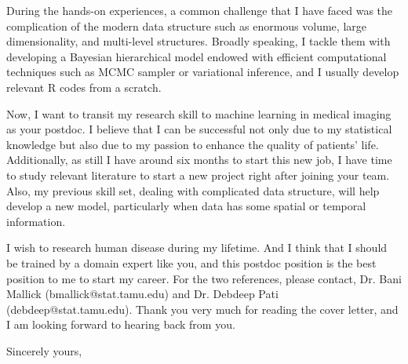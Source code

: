 \documentclass[9pt]{letter} %
\begin{document}
\begin{letter}{
}
During the hands-on experiences, a common challenge that I have faced was the complication of the modern data structure such as enormous volume, large dimensionality, and multi-level structures. Broadly speaking, I tackle them with developing a Bayesian hierarchical model endowed with efficient computational techniques such as MCMC sampler or variational inference, and I usually develop relevant R codes from a scratch.

Now, I want to transit my research skill to machine learning in medical imaging as your postdoc. I believe that I can be successful not only due to my statistical knowledge but also due to my passion to enhance the quality of patients' life. Additionally, as still I have around six months to start this new job, I have time to study relevant literature to start a new project right after joining your team. Also, my previous skill set, dealing with complicated data structure, will help develop a new model, particularly when data has some spatial or temporal information.

I wish to research human disease during my lifetime. And I think that I should be trained by a domain expert like you, and this postdoc position is the best position to me to start my career. For the two references, please contact, Dr. Bani Mallick (bmallick@stat.tamu.edu) and Dr. Debdeep Pati (debdeep@stat.tamu.edu). Thank you very much for reading the cover letter, and I am looking forward to
hearing back from you.

\closing{Sincerely yours,}


\end{letter}
\end{document}

